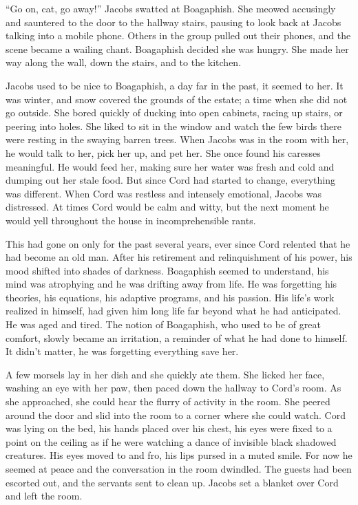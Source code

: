 \documentclass[
]{article}
\begin{document}
``Go on, cat, go away!'' Jacobs swatted at Boagaphish. She meowed
accusingly and sauntered to the door to the hallway stairs, pausing to
look back at Jacobs talking into a mobile phone. Others in the group
pulled out their phones, and the scene became a wailing chant.
Boagaphish decided she was hungry. She made her way along the wall, down
the stairs, and to the kitchen.

Jacobs used to be nice to Boagaphish, a day far in the past, it seemed
to her. It was winter, and snow covered the grounds of the estate; a
time when she did not go outside. She bored quickly of ducking into open
cabinets, racing up stairs, or peering into holes. She liked to sit in
the window and watch the few birds there were resting in the swaying
barren trees. When Jacobs was in the room with her, he would talk to
her, pick her up, and pet her. She once found his caresses meaningful.
He would feed her, making sure her water was fresh and cold and dumping
out her stale food. But since Cord had started to change, everything was
different. When Cord was restless and intensely emotional, Jacobs was
distressed. At times Cord would be calm and witty, but the next moment
he would yell throughout the house in incomprehensible rants.

This had gone on only for the past several years, ever since Cord
relented that he had become an old man. After his retirement and
relinquishment of his power, his mood shifted into shades of darkness.
Boagaphish seemed to understand, his mind was atrophying and he was
drifting away from life. He was forgetting his theories, his equations,
his adaptive programs, and his passion. His life's work realized in
himself, had given him long life far beyond what he had anticipated. He
was aged and tired. The notion of Boagaphish, who used to be of great
comfort, slowly became an irritation, a reminder of what he had done to
himself. It didn't matter, he was forgetting everything save her.

A few morsels lay in her dish and she quickly ate them. She licked her
face, washing an eye with her paw, then paced down the hallway to Cord's
room. As she approached, she could hear the flurry of activity in the
room. She peered around the door and slid into the room to a corner
where she could watch. Cord was lying on the bed, his hands placed over
his chest, his eyes were fixed to a point on the ceiling as if he were
watching a dance of invisible black shadowed creatures. His eyes moved
to and fro, his lips pursed in a muted smile. For now he seemed at peace
and the conversation in the room dwindled. The guests had been escorted
out, and the servants sent to clean up. Jacobs set a blanket over Cord
and left the room.
\end{document}
